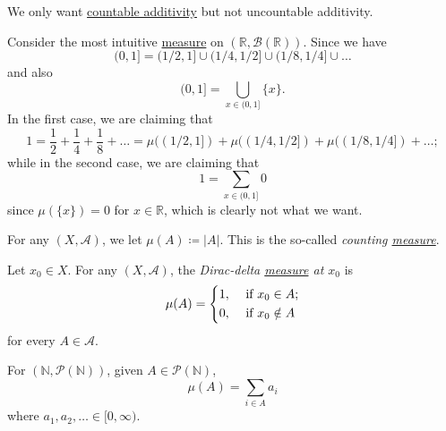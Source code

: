 \begin{remark}
	We only want \hyperref[def:measure-countable-additivity]{countable additivity} but not uncountable additivity.
\end{remark}
\begin{explanation}
	Consider the most intuitive \hyperref[def:measure]{measure} on \((\mathbb{R} , \mathcal{B} (\mathbb{R}))\). Since we have
	\[
		(0, 1] = (1 / 2, 1]\cup (1 / 4, 1 / 2]\cup (1 / 8, 1 / 4]\cup \dots
	\]
	and also
	\[
		(0, 1] = \bigcup_{x\in (0, 1]}\{x\}.
	\]
	In the first case, we are claiming that
	\[
		1
		= \frac{1}{2} + \frac{1}{4} + \frac{1}{8} + \dots
		= \mu((1 / 2, 1]) + \mu((1 / 4, 1 / 2]) + \mu((1 / 8, 1 / 4]) + \dots ;
	\]
	while in the second case, we are claiming that
	\[
		1 = \sum_{x\in(0, 1]} 0
	\]
	since \(\mu(\{ x \} ) = 0\) for \(x\in \mathbb{R} \), which is clearly not what we want.
\end{explanation}

\begin{eg}\label{eg:counting-measure}
	For any \((X, \mathcal{A})\), we let \(\mu(A) \coloneqq \vert A \vert\). This is the so-called \emph{counting \hyperref[def:measure]{measure}}.
\end{eg}
\begin{eg}\label{eg:Dirac-delta-measure}
	Let \(x_0\in X\). For any \((X, \mathcal{A})\), the \emph{Dirac-delta \hyperref[def:measure]{measure} at \(x_0\)} is
	\[
		\mu(A) = \begin{dcases}
			1, & \text{ if } x_0\in A;   \\
			0, & \text{ if } x_0\notin A
		\end{dcases}
	\]
	for every \(A\in \mathcal{A} \).
\end{eg}
\begin{eg}
	For \((\mathbb{N}, \mathcal{P} (\mathbb{N} ))\), given \(A\in \mathcal{P} (\mathbb{N} )\),
	\[
		\mu(A) = \sum_{i\in A}a_{i}
	\]
	where \(a_1, a_2, \dots \in [0, \infty) \).
\end{eg}